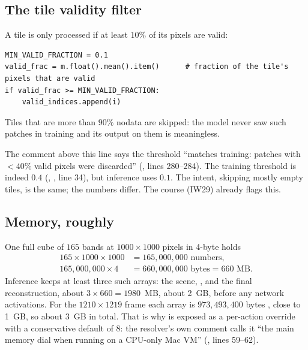 \subsection{The tile validity filter}

A tile is only processed if at least $10\%$ of its pixels are valid:
\begin{lstlisting}
MIN_VALID_FRACTION = 0.1
valid_frac = m.float().mean().item()      # fraction of the tile's pixels that are valid
if valid_frac >= MIN_VALID_FRACTION:
    valid_indices.append(i)
\end{lstlisting}
Tiles that are more than $90\%$ nodata are skipped: the model never saw such patches in training and its
output on them is meaningless.

\begin{sourcenote}
The comment above this line says the threshold ``matches training: patches with $<40\%$ valid pixels were
discarded'' (, lines 280--284). The training threshold is indeed $0.4$
(, ,
line 34), but inference uses $0.1$. The intent, skipping mostly empty tiles, is the same; the numbers
differ. The course (IW29) already flags this.
\end{sourcenote}

\subsection{Memory, roughly}

One full cube of $165$ bands at $1000\times1000$ pixels in 4-byte  holds
\begin{align*}
165\times1000\times1000 &= 165{,}000{,}000 \text{ numbers},\\
165{,}000{,}000\times4 &= 660{,}000{,}000 \text{ bytes} = 660\text{ MB}.
\end{align*}
Inference keeps at least three such arrays: the scene, , and the final reconstruction,
about $3\times660=1980$~MB, about 2~GB, before any network activations. For the $1210\times1219$ frame each
array is $973{,}493{,}400$ bytes \tagC, close to 1~GB, so about 3~GB in total. That is why
 is exposed as a per-action override with a conservative default of 8: the
resolver's own comment calls it ``the main memory dial when running on a CPU-only Mac VM''
(, lines 59--62).

